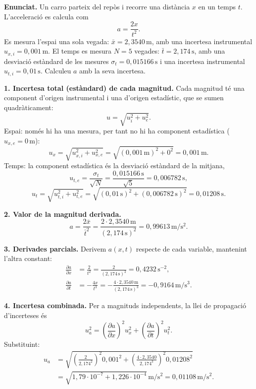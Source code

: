 \documentclass[12pt]{article}
\begin{document}
\begin{examplebox}{}

\textbf{Enunciat.} Un carro parteix del repòs i recorre una distància $x$ en un temps $t$. L'acceleració es calcula com
\[
    a = \frac{2x}{t^{2}}.
\]
Es mesura l'espai una sola vegada: $\bar{x} = 2{,}3540\,\mathrm{m}$, amb una incertesa instrumental $u_{x,i} = 0{,}001\,\mathrm{m}$. El temps es mesura $N = 5$ vegades: $\bar{t} = 2{,}174\,\mathrm{s}$, amb una desviació estàndard de les mesures $\sigma_t = 0{,}015166\,\mathrm{s}$ i una incertesa instrumental $u_{t,i} = 0{,}01\,\mathrm{s}$. Calculeu $a$ amb la seva incertesa.

\textbf{1. Incertesa total (estàndard) de cada magnitud.} Cada magnitud té una component d'origen instrumental i una d'origen estadístic, que se sumen quadràticament:
\[
    u = \sqrt{u_{i}^{2} + u_{e}^{2}}.
\]
Espai: només hi ha una mesura, per tant no hi ha component estadística ($u_{x,e} = 0\,\mathrm{m}$):
\[
    u_x = \sqrt{u_{x,i}^{2} + u_{x,e}^{2}} = \sqrt{(0{,}001\,\mathrm{m})^{2} + 0^{2}} = 0{,}001\,\mathrm{m}.
\]
Temps: la component estadística és la desviació estàndard de la mitjana,
\[
    u_{t,e} = \frac{\sigma_t}{\sqrt{N}} = \frac{0{,}015166\,\mathrm{s}}{\sqrt{5}} = 0{,}006782\,\mathrm{s},
\]
\[
    u_t = \sqrt{u_{t,i}^{2} + u_{t,e}^{2}} = \sqrt{(0{,}01\,\mathrm{s})^{2} + (0{,}006782\,\mathrm{s})^{2}} = 0{,}01208\,\mathrm{s}.
\]

\textbf{2. Valor de la magnitud derivada.}
\[
    a = \frac{2\bar{x}}{\bar{t}^{2}} = \frac{2 \cdot 2{,}3540\,\mathrm{m}}{(2{,}174\,\mathrm{s})^{2}} = 0{,}99613\,\mathrm{m/s^{2}}.
\]

\textbf{3. Derivades parcials.} Derivem $a(x,t)$ respecte de cada variable, mantenint l'altra constant:
\begin{align*}
    \frac{\partial a}{\partial x} &= \frac{2}{t^{2}} = \frac{2}{(2{,}174\,\mathrm{s})^{2}} = 0{,}4232\,\mathrm{s^{-2}},\\[4pt]
    \frac{\partial a}{\partial t} &= -\frac{4x}{t^{3}} = -\frac{4 \cdot 2{,}3540\,\mathrm{m}}{(2{,}174\,\mathrm{s})^{3}} = -0{,}9164\,\mathrm{m/s^{3}}.
\end{align*}

\textbf{4. Incertesa combinada.} Per a magnituds independents, la llei de propagació d'incerteses és
\[
    u_a^{2} = \left(\frac{\partial a}{\partial x}\right)^{2} u_x^{2} + \left(\frac{\partial a}{\partial t}\right)^{2} u_t^{2}.
\]
Substituint:
\begin{align*}
    u_a &= \sqrt{\left(\frac{2}{2{,}174^{2}}\right)^{2} 0{,}001^{2} + \left(\frac{4 \cdot 2{,}3540}{2{,}174^{3}}\right)^{2} 0{,}01208^{2}}\\[4pt]
        &= \sqrt{1{,}79 \cdot 10^{-7} + 1{,}226 \cdot 10^{-4}}\,\mathrm{m/s^{2}} = 0{,}01108\,\mathrm{m/s^{2}}.
\end{align*}


\end{examplebox}
\end{document}
